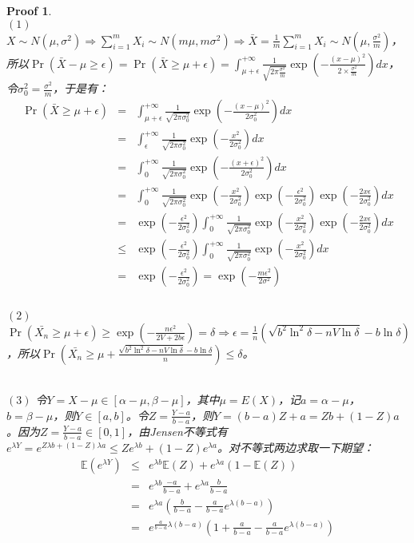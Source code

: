 \documentclass[a4paper,UTF8]{article}
\numberwithin{equation}{section}
\newtheorem*{myProof}{Proof}
\begin{document}
\begin{myProof}
~\\
$(1)$ $X \sim N(\mu, \sigma^2) \Longrightarrow \sum_{i=1}^m X_i \sim N(m\mu, m\sigma^2) \Longrightarrow \bar{X} = \frac{1}{m} \sum_{i=1}^m X_i \sim N(\mu, \frac{\sigma^2}{m})$，所以$\Pr(\bar{X} - \mu \ge \epsilon) = \Pr (\bar{X} \ge \mu + \epsilon) = \int_{\mu + \epsilon}^{+\infty} \frac{1}{\sqrt{2\pi \frac{\sigma^2}{m}}} \exp(- \frac{(x-\mu)^2}{2\times\frac{\sigma^2}{m}}) dx$，令$\sigma_0^2 = \frac{\sigma^2}{m}$，于是有：
\begin{eqnarray*}
\Pr (\bar{X} \ge \mu + \epsilon) &=& \int_{\mu + \epsilon}^{+\infty} \frac{1}{\sqrt{2\pi \sigma_0^2}} \exp(- \frac{(x-\mu)^2}{2\sigma_0^2}) dx \\
&=& \int_{\epsilon}^{+\infty} \frac{1}{\sqrt{2\pi \sigma_0^2}} \exp(- \frac{x^2}{2\sigma_0^2}) dx \\
&=& \int_{0}^{+\infty} \frac{1}{\sqrt{2\pi \sigma_0^2}} \exp(- \frac{(x + \epsilon)^2}{2\sigma_0^2}) dx \\
&=& \int_{0}^{+\infty} \frac{1}{\sqrt{2\pi \sigma_0^2}} \exp(- \frac{x^2}{2\sigma_0^2}) \exp(- \frac{\epsilon^2}{2\sigma_0^2}) \exp(- \frac{2x\epsilon}{2\sigma_0^2}) dx \\
&=& \exp(- \frac{\epsilon^2}{2\sigma_0^2}) \int_{0}^{+\infty} \frac{1}{\sqrt{2\pi \sigma_0^2}} \exp(- \frac{x^2}{2\sigma_0^2})  \exp(- \frac{2x\epsilon}{2\sigma_0^2}) dx \\
&\le& \exp(- \frac{\epsilon^2}{2\sigma_0^2}) \int_{0}^{+\infty} \frac{1}{\sqrt{2\pi \sigma_0^2}} \exp(- \frac{x^2}{2\sigma_0^2}) dx \\
&=& \exp(- \frac{\epsilon^2}{2\sigma_0^2}) = \exp(- \frac{m\epsilon^2}{2\sigma^2}) \\
\end{eqnarray*}
~\\
$(2)$ $\Pr(\bar{X_n} \ge \mu + \epsilon) \ge \exp(- \frac{n \epsilon^2}{2V + 2b\epsilon}) = \delta  \Longrightarrow \epsilon = \frac{1}{n}(\sqrt{b^2\ln^2\delta - nV\ln\delta} - b \ln\delta)$，所以$\Pr(\bar{X_n} \ge \mu + \frac{\sqrt{b^2\ln^2\delta - nV\ln\delta} - b \ln \delta}{n}) \le \delta$。

~\\
$(3)$ 令$Y = X - \mu \in [\alpha - \mu, \beta - \mu]$，其中$\mu = E(X)$，记$a = \alpha - \mu$， $b = \beta - \mu$，则$Y \in [a, b]$。令$Z = \frac{Y-a}{b-a}$，则$Y = (b-a)Z + a = Zb + (1 - Z)a$。因为$Z = \frac{Y-a}{b-a} \in [0, 1]$，由Jensen不等式有$e^{\lambda Y} = e^{Z \lambda b + (1-Z) \lambda a} \le Z e^{\lambda b} + (1-Z)e^{\lambda a}$。对不等式两边求取一下期望：
\begin{eqnarray*}
\mathbb{E}(e^{\lambda Y}) &\le& e^{\lambda b} \mathbb{E}(Z) + e^{\lambda a} (1 - \mathbb{E}(Z)) \\
&=& e^{\lambda b} \frac{-a}{b - a} + e ^ {\lambda a}\frac{b}{b - a} \\
&=& e ^ {\lambda a} \left(\frac{b}{b - a} - \frac{a}{b - a}e^{\lambda (b - a)} \right) \\
&=& e ^ {\frac{a}{b - a} \lambda (b - a)} \left(1 + \frac{a}{b - a} - \frac{a}{b - a}e^{\lambda (b - a)} \right) \\
\end{eqnarray*}


\end{myProof}
\end{document}
